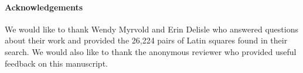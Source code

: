 \documentclass[runningheads]{llncs}
\begin{document}
\paragraph{Acknowledgements} We would like to thank Wendy Myrvold and Erin Delisle
who answered questions about their work and provided the 26,224 pairs of Latin squares
found in their search.  We would also like to thank the anonymous reviewer who
provided useful feedback on this manuscript.



\end{document}
